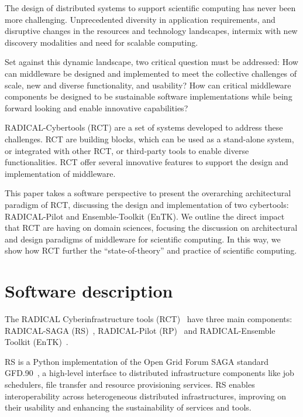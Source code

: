 \documentclass[preprint,12pt, a4paper]{elsarticle}
\begin{document}
The design of distributed systems to support scientific computing has never
been more challenging. Unprecedented diversity in application requirements,
and disruptive changes in the resources and technology landscapes, intermix
with new discovery modalities and need for scalable computing.

Set against this dynamic landscape, two critical question must be addressed:
How can middleware be designed and implemented to meet the collective
challenges of scale, new and diverse functionality, and usability? How can
critical middleware components be designed to be sustainable software
implementations while being forward looking and enable innovative
capabilities?

RADICAL-Cybertools (RCT) are a set of systems developed to address these
challenges.  RCT are building blocks, which can be used as a stand-alone
system, or integrated with other RCT, or third-party tools to enable diverse
functionalities. RCT offer several innovative features to support the design
and implementation of middleware.

This paper takes a software perspective to present the overarching
architectural paradigm of RCT, discussing the design and implementation of
two cybertools: RADICAL-Pilot and Ensemble-Toolkit (EnTK). We outline the
direct impact that RCT are having on domain sciences, focusing the discussion
on architectural and design paradigms of middleware for scientific computing.
In this way, we show how RCT further the ``state-of-theory'' and practice of
scientific computing.


\section{Software description}\label{sec:description}


The RADICAL Cyberinfrastructure tools (RCT)~\cite{github-rct} have three main
components: RADICAL-SAGA (RS)~\cite{merzky2015saga}, RADICAL-Pilot
(RP)~\cite{merzky2018using} and RADICAL-Ensemble Toolkit
(EnTK)~\cite{balasubramanian2018harnessing}.

RS is a Python implementation of the Open Grid Forum SAGA standard 
GFD.90~\cite{goodale2006saga}, a high-level interface to distributed
infrastructure components like job schedulers, file transfer and resource
provisioning services. RS enables interoperability across heterogeneous
distributed infrastructures, improving on their usability and enhancing the
sustainability of services and tools.
\end{document}
